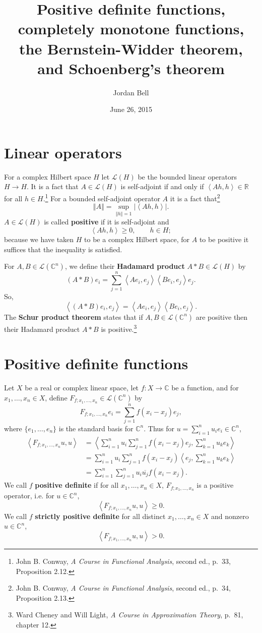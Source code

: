 \documentclass{article}
\newcommand{\inner}[2]{\left\langle #1, #2 \right\rangle}
\newcommand{\norm}[1]{\left\Vert #1 \right\Vert}
\theoremstyle{definition}
\theoremstyle{definition}
\begin{document}
\title{Positive definite functions, completely monotone functions, the Bernstein-Widder theorem, and Schoenberg's theorem}
\author{Jordan Bell}
\date{June 26, 2015}

\maketitle

\section{Linear operators}
For a complex Hilbert space $H$ let $\mathscr{L}(H)$ be the bounded linear operators
$H \to H$. It is a fact that $A \in \mathscr{L}(H)$ is self-adjoint if and only if $\inner{Ah}{h} \in \mathbb{R}$ for all
$h \in H$.\footnote{John B. Conway, {\em A Course in Functional Analysis}, second ed., p.~33, Proposition 2.12.}
For a bounded self-adjoint operator $A$ it is a fact
that\footnote{John B. Conway, {\em A Course in Functional Analysis}, second ed., p.~34, Proposition 2.13.}
\[
\norm{A} = \sup_{\norm{h} = 1} |\inner{Ah}{h}|.
\]
$A \in \mathscr{L}(H)$ is called \textbf{positive} if it is self-adjoint and 
\[
\inner{Ah}{h} \geq 0, \qquad h \in H;
\]
because we have taken $H$ to be a complex Hilbert space,  for $A$ to be positive it suffices that the inequality is satisfied. 

For $A,B \in \mathscr{L}(\mathbb{C}^n)$, we define
their \textbf{Hadamard product} $A * B \in \mathscr{L}(H)$ by
\[
(A*B)e_i = \sum_{j=1}^n \inner{Ae_i}{e_j} \inner{Be_i}{e_j} e_j.
\]
So,
\[
\inner{(A*B)e_i}{e_j} = \inner{Ae_i}{e_j} \inner{Be_i}{e_j}.
\]
The \textbf{Schur product theorem} states that if $A,B \in \mathscr{L}(\mathbb{C}^n)$ are positive then
their Hadamard product $A * B$ is positive.\footnote{Ward Cheney and Will Light, {\em A Course
in Approximation Theory}, p.~81, chapter 12.}


\section{Positive definite functions}
Let $X$ be a real or complex linear space, let  $f:X \to \mathbb{C}$ be a function, and for
$x_1,\ldots,x_n \in X$, define $F_{f;x_1,\ldots,x_n} \in \mathscr{L}(\mathbb{C}^n)$ by
\[
F_{f;x_1,\ldots,x_n}e_i = \sum_{j=1}^n f(x_i-x_j) e_j,
\]
where $\{e_1,\ldots,e_n\}$ is the standard basis for $\mathbb{C}^n$.
 Thus for
$u=\sum_{i=1}^n u_i e_i \in \mathbb{C}^n$,
\begin{align*}
\inner{F_{f;x_1,\ldots,x_n}u}{u}&=\inner{\sum_{i=1}^n u_i \sum_{j=1}^n f(x_i-x_j) e_j}{\sum_{k=1}^n u_k e_k}\\
&=\sum_{i=1}^n u_i \sum_{j=1}^n f(x_i-x_j) \inner{e_j}{\sum_{k=1}^n u_k e_k}\\
&=\sum_{i=1}^n  \sum_{j=1}^n u_i \overline{u_j} f(x_i-x_j).
\end{align*}
We call $f$  \textbf{positive definite} if
for all $x_1,\ldots,x_n \in X$,
$F_{f;x_1,\ldots,x_n}$ is a positive operator, i.e. for
 $u \in \mathbb{C}^n$,
\[
\inner{F_{f;x_1,\ldots,x_n}u}{u} \geq 0.
\]
We call $f$
\textbf{strictly positive definite} for all distinct $x_1,\ldots,x_n \in X$ and nonzero $u \in \mathbb{C}^n$,
\[
\inner{F_{f;x_1,\ldots,x_n}u}{u} >0.
\]
\end{document}

